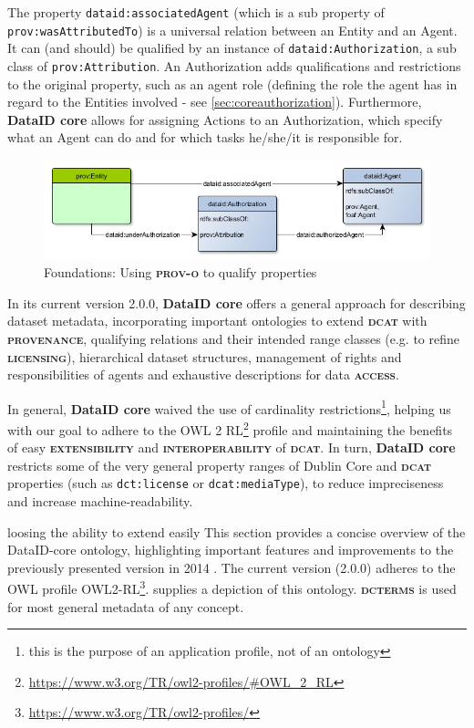 \documentclass[a4paper,english,twoside,BCOR1.5cm,headsepline,DIV12,appendixprefix,final,12pt]{scrbook}
\newcommand{\provenance}{{\ttfamily\scshape\bfseries provenance}\xspace}
\newcommand{\licensing}{{\ttfamily\scshape\bfseries licensing}\xspace}
\newcommand{\access}{{\ttfamily\scshape\bfseries access}\xspace}
\newcommand{\extensibility}{{\ttfamily\scshape\bfseries extensibility}\xspace}
\newcommand{\interoperability}{{\ttfamily\scshape\bfseries interoperability}\xspace}
\newcommand{\core}{{\ttfamily\bfseries DataID core}\xspace}
\newcommand{\prov}{{\scshape\bfseries prov-o}\xspace}
\newcommand{\dct}{{\scshape\bfseries dcterms}\xspace}
\newcommand{\dcat}{{\scshape\bfseries dcat}\xspace}
\newcommand{\prop}[1]{{{\texttt{#1}}}}
\newcommand\footnoteurl[1]{\footnote{\scriptsize\url{#1}}}
\begin{document}
The property \prop{dataid:associatedAgent} (which is a sub property of \prop{prov:wasAttributedTo}) is a universal relation between an Entity and an Agent. It can (and should) be qualified by an instance of \prop{dataid:Authorization}, a sub class of \prop{prov:Attribution}. An Authorization adds qualifications and restrictions to the original property, such as an agent role (defining the role the agent has in regard to the Entities involved - see \cref{sec:coreauthorization}). Furthermore, \core allows for assigning Actions to an Authorization, which specify what an Agent can do and for which tasks he/she/it is responsible for.

\begin{figure}[!htbp]
\centering
  \includegraphics[width=\textwidth]{images/FoundationalConseptProv.png}
  \caption{Foundations: Using \prov to qualify properties}
  \label{fig:foundations}
\end{figure}

In its current version 2.0.0, \core offers a general approach for describing dataset metadata, incorporating important ontologies to extend \dcat with \provenance, qualifying relations and their intended range classes (e.g. to refine \licensing), hierarchical dataset structures, management of rights and responsibilities of agents and exhaustive descriptions for data \access. 

In general, \core waived the use of cardinality restrictions\footnote{this is the purpose of an application profile, not of an ontology}, helping us with our goal to adhere to the OWL 2 RL\footnoteurl{https://www.w3.org/TR/owl2-profiles/#OWL_2_RL} profile and maintaining the benefits of easy \extensibility and \interoperability of \dcat. In turn, \core restricts some of the very general property ranges of Dublin Core and \dcat properties (such as \prop{dct:license} or \prop{dcat:mediaType}), to reduce impreciseness and increase machine-readability.

 loosing the ability to extend easily 
This section provides a concise overview of the DataID-core ontology, highlighting important features and improvements to the previously presented version in 2014 \cite{dataID2014}. The current version (2.0.0) adheres to the OWL profile OWL2-RL\footnoteurl{https://www.w3.org/TR/owl2-profiles/}. 
 supplies a depiction of this ontology. \dct is used for most general metadata of any concept.
\end{document}
